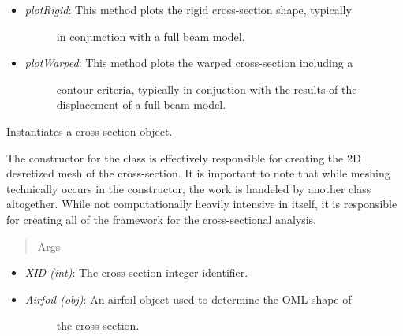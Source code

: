 \documentclass[letterpaper,10pt,english]{sphinxmanual}
\begin{document}
\begin{fulllineitems}
\begin{itemize}
\begin{description}
\end{description}

\item {} \begin{description}
\item[{\emph{plotRigid}: This method plots the rigid cross-section shape, typically}] \leavevmode
in conjunction with a full beam model.

\end{description}

\item {} \begin{description}
\item[{\emph{plotWarped}: This method plots the warped cross-section including a}] \leavevmode
contour criteria, typically in conjuction with the results of the
displacement of a full beam model.

\end{description}

\end{itemize}

\begin{fulllineitems}
\label{structures:AeroComBAT.Structures.XSect.__init__}
Instantiates a cross-section object.

The constructor for the class is effectively responsible for creating
the 2D desretized mesh of the cross-section. It is important to note
that while meshing technically occurs in the constructor, the work is
handeled by another class altogether. While not
computationally heavily intensive in itself, it is responsible for
creating all of the framework for the cross-sectional analysis.
\begin{quote}\begin{description}
\item[{Args}] \leavevmode
\end{description}\end{quote}
\begin{itemize}
\item {} 
\emph{XID (int)}: The cross-section integer identifier.

\item {} \begin{description}
\item[{\emph{Airfoil (obj)}: An airfoil object used to determine the OML shape of}] \leavevmode
the cross-section.


\end{description}
\end{itemize}
\end{fulllineitems}
\end{fulllineitems}
\end{document}
